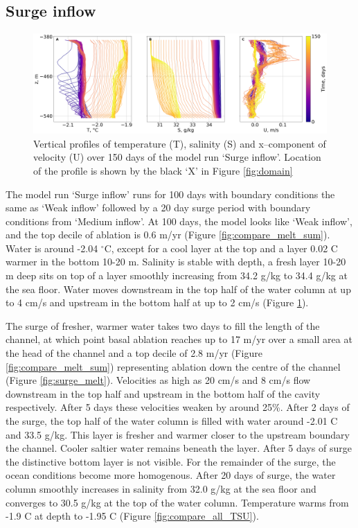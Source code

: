 \subsection{Surge inflow} \label{sec:surge_inflow}

\begin{figure}[!ht]
\centering
\includegraphics[width=1\textwidth]{chapters/4/surge_inflow_TSU.png}
\caption[Surge inflow (T,S,U)]{Vertical profiles of temperature (T), salinity (S) and x--component of velocity (U) over 150 days of the model run `Surge inflow'. Location of the profile is shown by the black `X' in Figure \ref{fig:domain}}
\label{fig:surge_inflow_TSU}
\end{figure}

The model run `Surge inflow' runs for 100 days with boundary conditions the same as `Weak inflow' followed by a 20 day surge period with boundary conditions from `Medium inflow'. At 100 days, the model looks like `Weak inflow', and the top decile of ablation is 0.6 m/yr (Figure \ref{fig:compare_melt_sum}). Water is around -2.04 $^{\circ}$C, except for a cool layer at the top and a layer 0.02 \textdegree C warmer in the bottom 10-20 m. Salinity is stable with depth, a fresh layer 10-20 m deep sits on top of a layer smoothly increasing from 34.2 g/kg to 34.4 g/kg at the sea floor. Water moves downstream in the top half of the water column at up to 4 cm/s and upstream in the bottom half at up to 2 cm/s (Figure \ref{fig:surge_inflow_TSU}). 

The surge of fresher, warmer water takes two days to fill the length of the channel, at which point basal ablation reaches up to 17 m/yr over a small area at the head of the channel and a top decile of 2.8 m/yr (Figure \ref{fig:compare_melt_sum}) representing ablation down the centre of the channel (Figure \ref{fig:surge_melt}). Velocities as high as 20 cm/s and 8 cm/s flow downstream in the top half and upstream in the bottom half of the cavity respectively. After 5 days these velocities weaken by around 25\%. After 2 days of the surge, the top half of the water column is filled with water around -2.01 \textdegree C and 33.5 g/kg. This layer is fresher and warmer closer to the upstream boundary the channel. Cooler saltier water remains beneath the layer. After 5 days of surge  the distinctive bottom layer is not visible. For the remainder of the surge, the ocean conditions become more homogenous. After 20 days of surge, the water column smoothly increases in salinity from  32.0 g/kg at the sea floor and converges to 30.5 g/kg at the top of the water column. Temperature warms from -1.9  \textdegree C at depth to -1.95 \textdegree C (Figure \ref{fig:compare_all_TSU}). 


